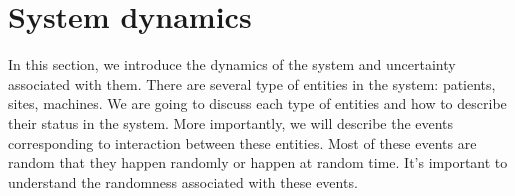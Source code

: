 \section{System dynamics}

In this section, we introduce the dynamics of the system and uncertainty associated with them. There are several type of entities in the system: patients, sites, machines. We are going to discuss each type of entities and how to describe their status in the system. More importantly, we will describe the events corresponding to interaction between these entities. Most of these events are random that they happen randomly or happen at random time. It's important to understand the randomness associated with these events.




